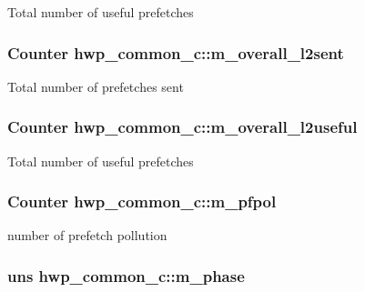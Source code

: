 \label{classhwp__common__c_af23abcaf04aa6842a3a083d085ee1c37}
Total number of useful prefetches \hypertarget{classhwp__common__c_ab819b7205b88fe7311e2b95667cd2410}{
\subsubsection[{m\_\-overall\_\-l2sent}]{\setlength{\rightskip}{0pt plus 5cm}Counter {\bf hwp\_\-common\_\-c::m\_\-overall\_\-l2sent}}}
\label{classhwp__common__c_ab819b7205b88fe7311e2b95667cd2410}
Total number of prefetches sent \hypertarget{classhwp__common__c_a54101466f7f886b6650aef05b6e4bcd3}{
\subsubsection[{m\_\-overall\_\-l2useful}]{\setlength{\rightskip}{0pt plus 5cm}Counter {\bf hwp\_\-common\_\-c::m\_\-overall\_\-l2useful}}}
\label{classhwp__common__c_a54101466f7f886b6650aef05b6e4bcd3}
Total number of useful prefetches \hypertarget{classhwp__common__c_abbf386422494c8ae2e60c1d2cafd5c04}{
\subsubsection[{m\_\-pfpol}]{\setlength{\rightskip}{0pt plus 5cm}Counter {\bf hwp\_\-common\_\-c::m\_\-pfpol}}}
\label{classhwp__common__c_abbf386422494c8ae2e60c1d2cafd5c04}
number of prefetch pollution \hypertarget{classhwp__common__c_a6e07cfc36d0a0f955a347608acf7681c}{
\subsubsection[{m\_\-phase}]{\setlength{\rightskip}{0pt plus 5cm}uns {\bf hwp\_\-common\_\-c::m\_\-phase}}}
